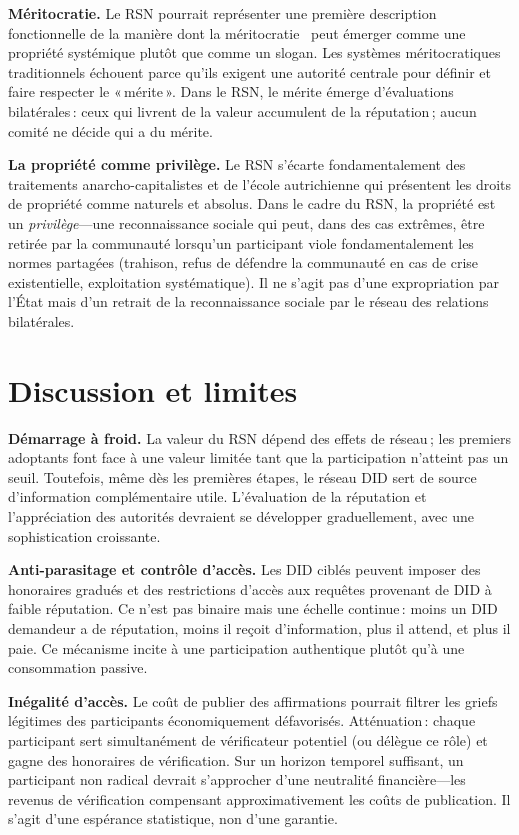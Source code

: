 \documentclass[11pt,a4paper,twocolumn]{article}
\begin{document}
\textbf{Méritocratie.} Le RSN pourrait représenter une première description fonctionnelle de la manière dont la méritocratie~\cite{young1958} peut émerger comme une propriété systémique plutôt que comme un slogan. Les systèmes méritocratiques traditionnels échouent parce qu'ils exigent une autorité centrale pour définir et faire respecter le «\,mérite\,». Dans le RSN, le mérite émerge d'évaluations bilatérales\,: ceux qui livrent de la valeur accumulent de la réputation\,; aucun comité ne décide qui a du mérite.

\textbf{La propriété comme privilège.} Le RSN s'écarte fondamentalement des traitements anarcho-capitalistes et de l'école autrichienne qui présentent les droits de propriété comme naturels et absolus. Dans le cadre du RSN, la propriété est un \emph{privilège}---une reconnaissance sociale qui peut, dans des cas extrêmes, être retirée par la communauté lorsqu'un participant viole fondamentalement les normes partagées (trahison, refus de défendre la communauté en cas de crise existentielle, exploitation systématique). Il ne s'agit pas d'une expropriation par l'État mais d'un retrait de la reconnaissance sociale par le réseau des relations bilatérales.

\section{Discussion et limites}

\textbf{Démarrage à froid.} La valeur du RSN dépend des effets de réseau\,; les premiers adoptants font face à une valeur limitée tant que la participation n'atteint pas un seuil. Toutefois, même dès les premières étapes, le réseau DID sert de source d'information complémentaire utile. L'évaluation de la réputation et l'appréciation des autorités devraient se développer graduellement, avec une sophistication croissante.

\textbf{Anti-parasitage et contrôle d'accès.} Les DID ciblés peuvent imposer des honoraires gradués et des restrictions d'accès aux requêtes provenant de DID à faible réputation. Ce n'est pas binaire mais une échelle continue\,: moins un DID demandeur a de réputation, moins il reçoit d'information, plus il attend, et plus il paie. Ce mécanisme incite à une participation authentique plutôt qu'à une consommation passive.

\textbf{Inégalité d'accès.} Le coût de publier des affirmations pourrait filtrer les griefs légitimes des participants économiquement défavorisés. Atténuation\,: chaque participant sert simultanément de vérificateur potentiel (ou délègue ce rôle) et gagne des honoraires de vérification. Sur un horizon temporel suffisant, un participant non radical devrait s'approcher d'une neutralité financière---les revenus de vérification compensant approximativement les coûts de publication. Il s'agit d'une espérance statistique, non d'une garantie.
\end{document}
